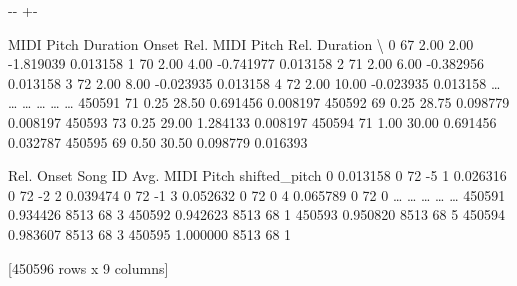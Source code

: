 \documentclass[letterpaper,10pt,english]{sphinxmanual}
\newlength\nbsphinxcodecellspacing
\begin{document}
{

\kern-\sphinxverbatimsmallskipamount\kern-\baselineskip
\kern+\FrameHeightAdjust\kern-\fboxrule
\vspace{\nbsphinxcodecellspacing}

\begin{sphinxVerbatim}[commandchars=\\\{\}]
\llap{\color{nbsphinxout}[53]:\,\hspace{\fboxrule}\hspace{\fboxsep}}        MIDI Pitch  Duration  Onset  Rel. MIDI Pitch  Rel. Duration  \textbackslash{}
0               67      2.00   2.00        -1.819039       0.013158
1               70      2.00   4.00        -0.741977       0.013158
2               71      2.00   6.00        -0.382956       0.013158
3               72      2.00   8.00        -0.023935       0.013158
4               72      2.00  10.00        -0.023935       0.013158
{\ldots}            {\ldots}       {\ldots}    {\ldots}              {\ldots}            {\ldots}
450591          71      0.25  28.50         0.691456       0.008197
450592          69      0.25  28.75         0.098779       0.008197
450593          73      0.25  29.00         1.284133       0.008197
450594          71      1.00  30.00         0.691456       0.032787
450595          69      0.50  30.50         0.098779       0.016393

        Rel. Onset  Song ID  Avg. MIDI Pitch  shifted\_pitch
0         0.013158        0               72             -5
1         0.026316        0               72             -2
2         0.039474        0               72             -1
3         0.052632        0               72              0
4         0.065789        0               72              0
{\ldots}            {\ldots}      {\ldots}              {\ldots}            {\ldots}
450591    0.934426     8513               68              3
450592    0.942623     8513               68              1
450593    0.950820     8513               68              5
450594    0.983607     8513               68              3
450595    1.000000     8513               68              1

[450596 rows x 9 columns]
\end{sphinxVerbatim}
}

{
\begin{sphinxVerbatim}[commandchars=\\\{\}]
\llap{\color{nbsphinxin}[63]:\,\hspace{\fboxrule}\hspace{\fboxsep}} 
\end{sphinxVerbatim}
}
\end{document}
